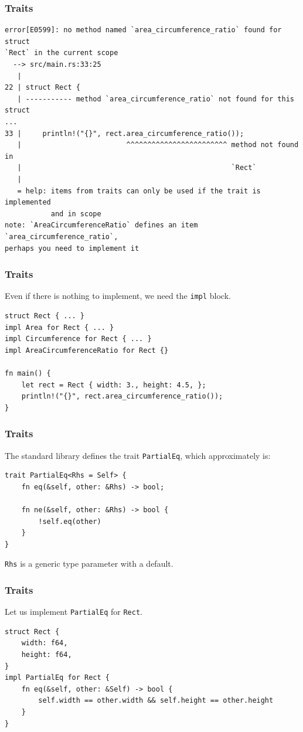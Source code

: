 \begin{frame}[fragile]
    \frametitle{Traits}
    \begin{verbatim}
error[E0599]: no method named `area_circumference_ratio` found for struct
`Rect` in the current scope
  --> src/main.rs:33:25
   |
22 | struct Rect {
   | ----------- method `area_circumference_ratio` not found for this struct
...
33 |     println!("{}", rect.area_circumference_ratio());
   |                         ^^^^^^^^^^^^^^^^^^^^^^^^ method not found in
   |                                                  `Rect`
   |
   = help: items from traits can only be used if the trait is implemented
           and in scope
note: `AreaCircumferenceRatio` defines an item `area_circumference_ratio`,
perhaps you need to implement it
    \end{verbatim}
\end{frame}

\begin{frame}[fragile]
    \frametitle{Traits}
    Even if there is nothing to implement, we need the \texttt{impl} block.
    \vfill
    \begin{verbatim}
struct Rect { ... }
impl Area for Rect { ... }
impl Circumference for Rect { ... }
impl AreaCircumferenceRatio for Rect {}

fn main() {
    let rect = Rect { width: 3., height: 4.5, };
    println!("{}", rect.area_circumference_ratio());
}
    \end{verbatim}
\end{frame}

\begin{frame}[fragile]
    \frametitle{Traits}
    The standard library defines the trait \texttt{PartialEq}, which approximately is:
    \vfill
    \begin{verbatim}
trait PartialEq<Rhs = Self> {
    fn eq(&self, other: &Rhs) -> bool;

    fn ne(&self, other: &Rhs) -> bool {
        !self.eq(other)
    }
}
    \end{verbatim}
    \pause
    \vfill
    \texttt{Rhs} is a generic type parameter with a default.
\end{frame}

\begin{frame}[fragile]
    \frametitle{Traits}
    Let us implement \texttt{PartialEq} for \texttt{Rect}.
    \vfill
    \begin{verbatim}
struct Rect {
    width: f64,
    height: f64,
}
impl PartialEq for Rect {
    fn eq(&self, other: &Self) -> bool {
        self.width == other.width && self.height == other.height
    }
}
    \end{verbatim}
\end{frame}

